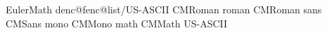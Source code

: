 %
\mathfontfamilyposthook EulerMath {%
  \cm@digits
  \cm@upper@greek
  \cm@lower@greek
  \cm@ordinary
  \cm@binary
  \cm@relations
  \cm@delims
  \cm@prime
  \cm@fillarrows
}%
%
%
%
%
%
%
%
\expandafter\let\expandafter\cur@fenc@list
  \csname denc@fenc@list/US-ASCII\endcsname
\fontbasefamily CMRoman %
%
\fontfamily roman CMRoman
\fontfamily sans CMSans
\fontfamily mono CMMono
\fontfamily math CMMath
%
\documentencoding US-ASCII
%
\endinput
